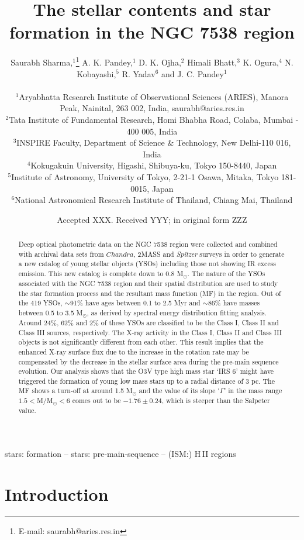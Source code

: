 \documentclass[a4paper,fleqn,usenatbib,useAMS]{mnras}
\title[NGC 7538]{The stellar contents and star formation in the NGC 7538 region}
\author[Sharma et al.]{
Saurabh Sharma,$^{1}$\thanks{E-mail: saurabh@aries.res.in}
A. K. Pandey,$^{1}$ D. K. Ojha,$^{2}$ Himali Bhatt,$^{3}$ K. Ogura,$^{4}$
\newauthor
N. Kobayashi,$^{5}$ R. Yadav$^{6}$ and J. C. Pandey$^{1}$
\\\\
$^{1}$Aryabhatta Research Institute of Observational Sciences (ARIES), Manora Peak, Nainital, 263 002, India, saurabh@aries.res.in\\
$^{2}$Tata Institute of Fundamental Research, Homi Bhabha Road, Colaba, Mumbai - 400 005, India\\
$^{3}$INSPIRE Faculty, Department of Science \& Technology, New Delhi-110 016, India\\
$^{4}$Kokugakuin University, Higashi, Shibuya-ku, Tokyo 150-8440, Japan\\
$^{5}$Institute of Astronomy, University of Tokyo, 2-21-1 Osawa, Mitaka, Tokyo 181-0015, Japan\\
$^{6}$National Astronomical Research Institute of Thailand, Chiang Mai, Thailand 
}
\date{Accepted XXX. Received YYY; in original form ZZZ}
\begin{document}
\label{firstpage}
\pagerange{\pageref{firstpage}--\pageref{lastpage}}
\maketitle


\begin{abstract}
 Deep optical photometric data on the NGC 7538 region were collected and combined with archival data sets 
from $Chandra$, 2MASS and {\it Spitzer} surveys in order to generate a new catalog of young stellar 
objects (YSOs) including those not showing IR excess emission.
 This new catalog is complete down to 0.8 M$_\odot$.
The  nature of the YSOs associated with the NGC 7538 region and their spatial distribution are used to study 
the star formation process and the resultant mass function (MF) in the region.
Out of the 419 YSOs,  $\sim$91\%  have ages between 0.1 to 2.5 Myr
and $\sim$86\%  have masses between 0.5 to 3.5 M$_\odot$,
as derived by spectral energy distribution fitting analysis.
Around 24\%, 62\% and 2\% of these YSOs are classified to be the Class I, Class II and Class III sources, respectively.
The X-ray activity in the Class I, Class II and Class III objects is not significantly different from each other.
This result implies that the enhanced X-ray surface flux due to the increase in the
rotation rate may be compensated by the decrease in the stellar surface area during the pre-main sequence evolution.
Our analysis shows that the O3V type high mass star `IRS 6' might have 
triggered the formation of young low mass stars up to a radial distance of 3 pc.
The MF shows a turn-off at around 1.5 M$_\odot$ and the value of its slope `$\Gamma$'
in the mass range $1.5 <$M/M$_\odot < 6$ comes out to be $-1.76\pm0.24$, 
which is  steeper than the Salpeter value.
\end{abstract}


\begin{keywords}
stars: formation -- stars: pre-main-sequence -- (ISM:) H\,{\sevensize II} regions
\end{keywords}


\section{Introduction}
\end{document}
